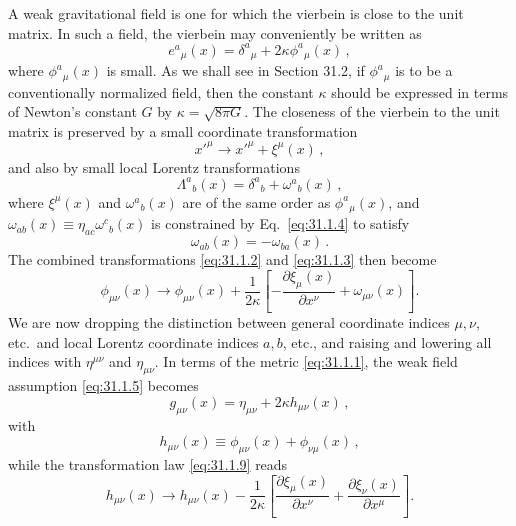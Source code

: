 A weak gravitational field is one for which the vierbein is close to the
unit matrix. In such a field, the vierbein may conveniently be written as
\begin{equation}
  e^a{}_\mu(x)=\delta^a{}_\mu+2\kappa\phi^a{}_\mu(x)\,,
  \tag{31.1.5}\label{eq:31.1.5}
\end{equation}
where \(\phi^a{}_\mu(x)\) is small. As we shall see in Section 31.2, if
\(\phi^a{}_\mu\) is to be a conventionally normalized field, then the
constant \(\kappa\) should be expressed in terms of Newton's constant \(G\)
by \(\kappa=\sqrt{8\pi G}\). The closeness of the vierbein to the unit matrix
is preserved by a small coordinate transformation
\begin{equation}
  x'^\mu\to x'^\mu+\xi^\mu(x)\,,
  \tag{31.1.6}\label{eq:31.1.6}
\end{equation}
and also by small local Lorentz transformations
\begin{equation}
  \Lambda^a{}_b(x)=\delta^a{}_b+\omega^a{}_b(x)\,,
  \tag{31.1.7}\label{eq:31.1.7}
\end{equation}
where \(\xi^\mu(x)\) and \(\omega^a{}_b(x)\) are of the same order as
\(\phi^a{}_\mu(x)\), and
\(\omega_{ab}(x)\equiv\eta_{ac}\omega^c{}_b(x)\) is constrained by
Eq.~\eqref{eq:31.1.4} to satisfy
\begin{equation}
  \omega_{ab}(x)=-\omega_{ba}(x)\,.
  \tag{31.1.8}\label{eq:31.1.8}
\end{equation}
The combined transformations \eqref{eq:31.1.2} and \eqref{eq:31.1.3} then
become
\begin{equation}
  \phi_{\mu\nu}(x)\to\phi_{\mu\nu}(x)
  +\frac{1}{2\kappa}
   \left[-\frac{\partial\xi_\mu(x)}{\partial x^\nu}
         +\omega_{\mu\nu}(x)\right].
  \tag{31.1.9}\label{eq:31.1.9}
\end{equation}
We are now dropping the distinction between general coordinate indices
\(\mu,\nu\), etc.\ and local Lorentz coordinate indices \(a,b\), etc., and
raising and lowering all indices with \(\eta^{\mu\nu}\) and \(\eta_{\mu\nu}\).
In terms of the metric \eqref{eq:31.1.1}, the weak field assumption
\eqref{eq:31.1.5} becomes
\begin{equation}
  g_{\mu\nu}(x)=\eta_{\mu\nu}+2\kappa h_{\mu\nu}(x)\,,
  \tag{31.1.10}\label{eq:31.1.10}
\end{equation}
with
\begin{equation}
  h_{\mu\nu}(x)\equiv\phi_{\mu\nu}(x)+\phi_{\nu\mu}(x)\,,
  \tag{31.1.11}\label{eq:31.1.11}
\end{equation}
while the transformation law \eqref{eq:31.1.9} reads
\begin{equation}
  h_{\mu\nu}(x)\to h_{\mu\nu}(x)
  -\frac{1}{2\kappa}
   \left[\frac{\partial\xi_\mu(x)}{\partial x^\nu}
         +\frac{\partial\xi_\nu(x)}{\partial x^\mu}\right].
  \tag{31.1.12}\label{eq:31.1.12}
\end{equation}

